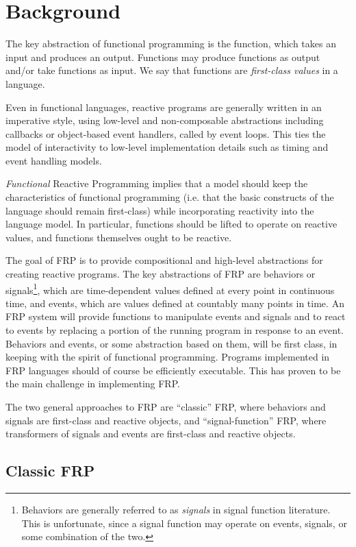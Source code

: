 \chapter{Background}
\label{chapter:Background}

The key abstraction of functional programming is the function, which takes an input and produces an output. Functions may produce functions
as output and/or take functions as input. We say that functions are {\em first-class values} in a language.

Even in functional languages, reactive programs are generally written in an imperative style, using low-level and non-composable abstractions including callbacks
or object-based event handlers, called by event loops. This ties the model of interactivity to low-level implementation details such as timing and event handling models. 

{\em Functional} Reactive Programming implies that a model should keep the characteristics of functional programming (i.e. that the basic constructs of the language
should remain first-class) while incorporating reactivity into the language model. In particular, functions should be lifted to operate on reactive values,
and functions themselves ought to be reactive.

The goal of FRP is to provide compositional and high-level abstractions for creating reactive programs. The key
abstractions of FRP are behaviors or signals\footnote{Behaviors are generally referred to as {\em signals} in signal function literature. This is unfortunate, since a signal
function may operate on events, signals, or some combination of the two.}, which are time-dependent values defined at every point in continuous time, and events, which are 
values defined at countably many points in time. An FRP system will provide functions to manipulate events and signals and to react
to events by replacing a portion of the running program in response to an event. Behaviors and events, or some abstraction
based on them, will be first class, in keeping with the spirit of functional programming. Programs implemented in FRP languages
should of course be efficiently executable. This has proven to be the main challenge in implementing FRP.

The two general approaches to FRP are ``classic'' FRP, where behaviors and signals are first-class and reactive objects, and ``signal-function'' FRP,
where transformers of signals and events are first-class and reactive objects.

\section{Classic FRP}
\label{section:Background-Classic_FRP}

